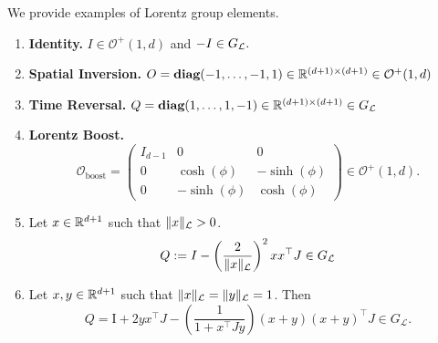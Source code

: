 \documentclass[twoside,11pt]{article}
\begin{document}
\begin{example}
We provide examples of Lorentz group elements. 
\begin{enumerate}
    \item \textbf{Identity.} $I \in \mathcal{O}^{+}(1,d)$ and $-I \in G_{\mathcal{L}}.$
   
    \item \textbf{Spatial Inversion.}  $O = \textbf{diag}(-1,\ldots, -1, 1) \in \mathbb{R}^{(d+1)\times(d+1)} \in \mathcal{O}^+(1,d)$
    \item \textbf{Time Reversal.} $Q = \textbf{diag}(1, \ldots, 1, -1) \in \mathbb{R}^{(d+1)\times(d+1)} \in G_{\mathcal{L}}$
    \item \textbf{Lorentz Boost.} 
    \[
\mathcal{O}_{\text{boost}} =
\begin{pmatrix}
I_{d-1} & 0 & 0 \\
0 & \cosh(\phi) & -\sinh(\phi) \\
0 & -\sinh(\phi) & \cosh(\phi)
\end{pmatrix} \in \mathcal{O}^+(1,d).
\]
    

     \item Let $x \in \mathbb{R}^{d+1}$ such that $\|x\|_{\mathcal{L}} > 0$. 
    \[
    Q := I - \left(\frac{2}{\|x\|_{\mathcal{L}}} \right)^2 x x^\top J \in G_{\mathcal{L}}
    \]
    \item Let $x,y \in \mathbb{R}^{d+1}$ such that $\|x\|_{\mathcal{L}} = \|y\|_{\mathcal{L}} = 1$. Then 
    \[
    Q=\mathrm{I}+2 y x^{\top} J-\left( \frac{1} {1+x^{\top} J y}\right)(x+y)(x+y)^{\top} J \in G_{\mathcal{L}} .
    \]
\end{enumerate}
    
\end{example}
\end{document}
